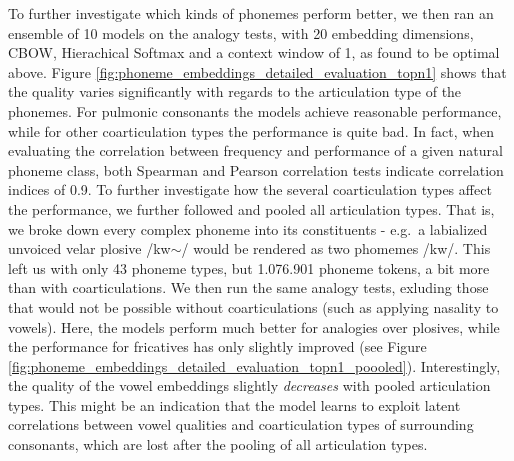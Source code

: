 \documentclass[6pt]{article}
\begin{document}
To further investigate which kinds of phonemes perform better, we then ran an ensemble of 10 models on the analogy tests, with 20 embedding dimensions, CBOW, Hierachical Softmax and a context window of 1, as found to be optimal above.
Figure \ref{fig:phoneme_embeddings_detailed_evaluation_topn1} shows that the quality varies significantly with regards to the articulation type of the phonemes. For pulmonic consonants the models achieve reasonable performance, while for other coarticulation types the performance is quite bad. In fact, when evaluating the correlation between frequency and performance of a given natural phoneme class, both Spearman and Pearson correlation tests indicate correlation indices of 0.9. 
To further investigate how the several coarticulation types affect the performance, we further followed \cite{jager2014phylogenetic,rama2016siamese} and pooled all articulation types. That is, we broke down every complex phoneme into its constituents - e.g.~a labialized unvoiced velar plosive /kw$\sim$/ would be rendered as two phomemes /kw/.  This left us with only 43 phoneme types, but 1.076.901 phoneme tokens, a bit more than with coarticulations. We then run the same analogy tests, exluding those that would not be possible without coarticulations (such as applying nasality to vowels). Here, the models perform much better for analogies over plosives, while the performance for fricatives has only slightly improved (see Figure \ref{fig:phoneme_embeddings_detailed_evaluation_topn1_poooled}). Interestingly, the quality of the vowel embeddings slightly \textit{decreases} with pooled articulation types. This might be an indication that the model learns to exploit latent correlations between vowel qualities and coarticulation types of surrounding consonants, which are lost after the pooling of all articulation types.
\end{document}
